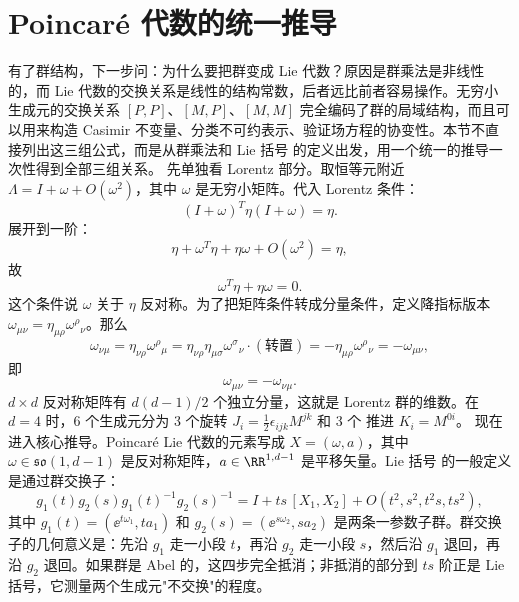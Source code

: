 \section{Poincaré 代数的统一推导}

有了群结构，下一步问：为什么要把群变成 Lie 代数？原因是群乘法是非线性的，而 Lie 代数的交换关系是线性的结构常数，后者远比前者容易操作。无穷小生成元的交换关系 $[P,P]$、$[M,P]$、$[M,M]$ 完全编码了群的局域结构，而且可以用来构造 Casimir 不变量、分类不可约表示、验证场方程的协变性。本节不直接列出这三组公式，而是从群乘法和 Lie 括号 的定义出发，用一个统一的推导一次性得到全部三组关系。
先单独看 Lorentz 部分。取恒等元附近 $\Lambda=I+\omega+O(\omega^2)$，其中 $\omega$ 是无穷小矩阵。代入 Lorentz 条件：
\begin{equation*}
(I+\omega)^T\eta(I+\omega)=\eta.
\end{equation*}
展开到一阶：
\begin{equation*}
\eta+\omega^T\eta+\eta\omega+O(\omega^2)=\eta,
\end{equation*}
故
\begin{equation}
\omega^T\eta+\eta\omega=0.
\end{equation}
这个条件说 $\omega$ 关于 $\eta$ 反对称。为了把矩阵条件转成分量条件，定义降指标版本 $\omega_{\mu\nu}=\eta_{\mu\rho}\omega^\rho{}_\nu$。那么
\begin{equation}
\omega_{\nu\mu}=\eta_{\nu\rho}\omega^\rho{}_\mu=\eta_{\nu\rho}\eta_{\mu\sigma}\omega^\sigma{}_\nu\cdot(\text{转置})=-\eta_{\mu\rho}\omega^\rho{}_\nu=-\omega_{\mu\nu},
\end{equation}
即
\begin{equation*}{\omega_{\mu\nu}=-\omega_{\nu\mu}.}
\end{equation*}
$d\times d$ 反对称矩阵有 $d(d-1)/2$ 个独立分量，这就是 Lorentz 群的维数。在 $d=4$ 时，6 个生成元分为 3 个旋转 $J_i=\frac{1}{2}\epsilon_{ijk}M^{jk}$ 和 3 个 推进 $K_i=M^{0i}$。
现在进入核心推导。Poincaré Lie 代数的元素写成 $X=(\omega,a)$，其中 $\omega\in\mathfrak{so}(1,d-1)$ 是反对称矩阵，$a\in\RR^{1,d-1}$ 是平移矢量。Lie 括号 的一般定义是通过群交换子：
\begin{equation}\label{eq:ms-poincare-bracket-def}
g_1(t)g_2(s)g_1(t)^{-1}g_2(s)^{-1}=I+ts\,[X_1,X_2]+O(t^2,s^2,t^2s,ts^2),
\end{equation}
其中 $g_1(t)=(\ee^{t\omega_1},ta_1)$ 和 $g_2(s)=(\ee^{s\omega_2},sa_2)$ 是两条一参数子群。群交换子的几何意义是：先沿 $g_1$ 走一小段 $t$，再沿 $g_2$ 走一小段 $s$，然后沿 $g_1$ 退回，再沿 $g_2$ 退回。如果群是 Abel 的，这四步完全抵消；非抵消的部分到 $ts$ 阶正是 Lie 括号，它测量两个生成元"不交换"的程度。


